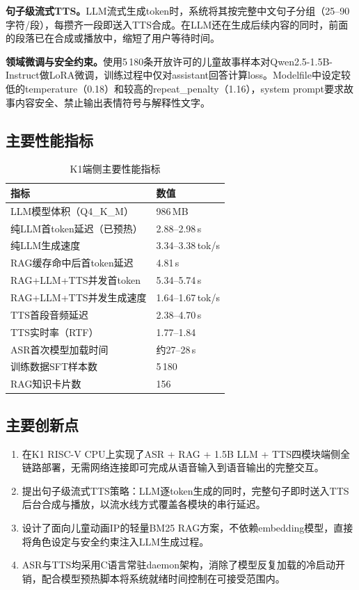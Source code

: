 \documentclass[lettersize,journal]{IEEEtran}
\begin{document}
\textbf{句子级流式TTS。}LLM流式生成token时，系统将其按完整中文句子分组（25--90字符/段），每攒齐一段即送入TTS合成。在LLM还在生成后续内容的同时，前面的段落已在合成或播放中，缩短了用户等待时间。

\textbf{领域微调与安全约束。}使用5\,180条开放许可的儿童故事样本对Qwen2.5-1.5B-Instruct做LoRA微调，训练过程中仅对assistant回答计算loss。Modelfile中设定较低的temperature（0.18）和较高的repeat\_penalty（1.16），system prompt要求故事内容安全、禁止输出表情符号与解释性文字。

\subsection{主要性能指标}

\begin{table}[H]
    \centering
    \caption{K1端侧主要性能指标}
    \label{tab:perf}
    \footnotesize
    \begin{tabular}{ll}
        \toprule
        \textbf{指标} & \textbf{数值} \\
        \midrule
        LLM模型体积（Q4\_K\_M） & 986\,MB \\
        纯LLM首token延迟（已预热） & 2.88--2.98\,s \\
        纯LLM生成速度 & 3.34--3.38\,tok/s \\
        RAG缓存命中后首token延迟 & 4.81\,s \\
        RAG+LLM+TTS并发首token & 5.34--5.74\,s \\
        RAG+LLM+TTS并发生成速度 & 1.64--1.67\,tok/s \\
        TTS首段音频延迟 & 2.38--4.70\,s \\
        TTS实时率（RTF） & 1.77--1.84 \\
        ASR首次模型加载时间 & 约27--28\,s \\
        训练数据SFT样本数 & 5\,180 \\
        RAG知识卡片数 & 156 \\
        \bottomrule
    \end{tabular}
\end{table}

\subsection{主要创新点}

\begin{enumerate}[leftmargin=*]
    \item 在K1 RISC-V CPU上实现了ASR + RAG + 1.5B LLM + TTS四模块端侧全链路部署，无需网络连接即可完成从语音输入到语音输出的完整交互。
    \item 提出句子级流式TTS策略：LLM逐token生成的同时，完整句子即时送入TTS后台合成与播放，以流水线方式覆盖各模块的串行延迟。
    \item 设计了面向儿童动画IP的轻量BM25 RAG方案，不依赖embedding模型，直接将角色设定与安全约束注入LLM生成过程。
    \item ASR与TTS均采用C语言常驻daemon架构，消除了模型反复加载的冷启动开销，配合模型预热脚本将系统就绪时间控制在可接受范围内。
\end{enumerate}
\end{document}
